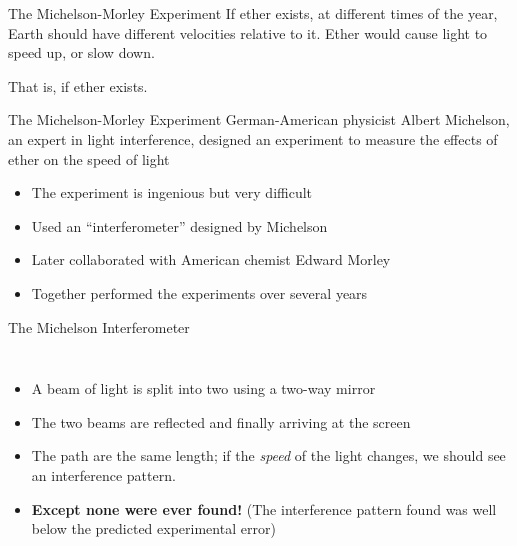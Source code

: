 \documentclass[12pt,compress,aspectratio=169]{beamer}
\begin{document}
\begin{frame}{The Michelson-Morley Experiment}
  If ether exists, at different times of the year, Earth should have different
  velocities relative to it. Ether would cause light to speed up, or slow down.
  \begin{center}
  \end{center}
  That is, if ether exists.
\end{frame}
  


\begin{frame}{The Michelson-Morley Experiment}
  German-American physicist Albert Michelson, an expert in light interference,
  designed an experiment to measure the effects of ether on the speed of light
  \begin{itemize}
  \item The experiment is ingenious but very difficult
  \item Used an ``interferometer'' designed by Michelson
  \item Later collaborated with American chemist Edward Morley
  \item Together performed the experiments over several years
  \end{itemize}
\end{frame}






\begin{frame}{The Michelson Interferometer}
  \begin{columns}

    \begin{itemize}
    \item A beam of light is split into two using a two-way mirror
    \item The two beams are reflected and finally arriving at the screen
    \item The path are the same length; if the \emph{speed} of the light
      changes, we should see an interference pattern.
    \item\textbf{Except none were ever found!} (The interference pattern
      found was well below the predicted experimental error)
   \end{itemize}
  \end{columns}
\end{frame}
\end{document}
